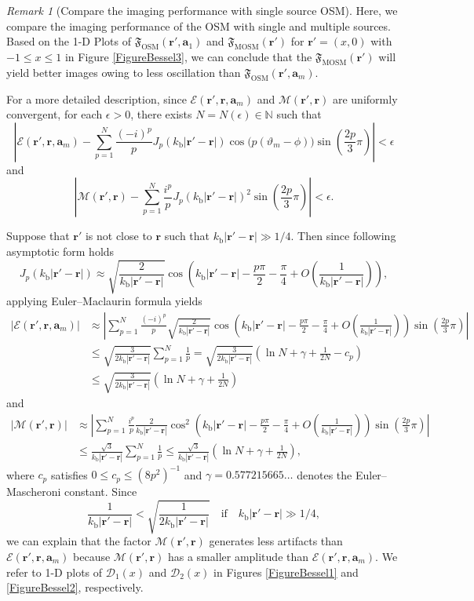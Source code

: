 \documentclass[3p,10pt]{elsarticle}
\newcommand{\kb}{k_{\mathrm{b}}}
\newcommand{\ma}{\mathbf{a}}
\newcommand{\mr}{\mathbf{r}}
\DeclareMathOperator*{\osm}{OSM}
\DeclareMathOperator*{\mosm}{MOSM}
\theoremstyle{plain}
\theoremstyle{remark}
\newtheorem{remark}{Remark}[section]
\begin{document}
\begin{remark}[Compare the imaging performance with single source OSM]\label{RemarkM3}
Here, we compare the imaging performance of the OSM with single and multiple sources. Based on the 1-D Plots of $\mathfrak{F}_{\osm}(\mr',\ma_1)$ and $\mathfrak{F}_{\mosm}(\mr')$ for $\mr'=(x,0)$ with $-1\leq x\leq 1$ in Figure \ref{FigureBessel3}, we can conclude that the $\mathfrak{F}_{\mosm}(\mr')$ will yield better images owing to less oscillation than $\mathfrak{F}_{\osm}(\mr',\ma_m)$.

For a more detailed description, since $\mathcal{E}(\mr',\mr,\ma_m)$ and $\mathcal{M}(\mr',\mr)$ are uniformly convergent, for each $\epsilon>0$, there exists $N=N(\epsilon)\in\mathbb{N}$ such that
\[\left|\mathcal{E}(\mr',\mr,\ma_m)-\sum_{p=1}^{N}\frac{(-i)^p}{p}J_p(\kb|\mr'-\mr|)\cos\big(p(\vartheta_m-\phi)\big)\sin\left(\frac{2p}{3}\pi\right)\right|<\epsilon\]
and
\[\left|\mathcal{M}(\mr',\mr)-\sum_{p=1}^{N}\frac{i^p}{p}J_p(\kb|\mr'-\mr|)^2\sin\left(\frac{2p}{3}\pi\right)\right|<\epsilon.\]

Suppose that $\mr'$ is not close to $\mr$ such that $\kb|\mr'-\mr|\gg1/4$. Then since following asymptotic form holds 
\[J_p(\kb|\mr'-\mr|)\approx\sqrt{\frac{2}{\kb|\mr'-\mr|}}\cos\left(\kb|\mr'-\mr|-\frac{p\pi}{2}-\frac{\pi}{4}+O\left(\frac{1}{\kb|\mr'-\mr|}\right)\right),\]
applying Euler–Maclaurin formula yields
\begin{align*}
|\mathcal{E}(\mr',\mr,\ma_m)|&\approx\left|\sum_{p=1}^{N}\frac{(-i)^p}{p}\sqrt{\frac{2}{\kb|\mr'-\mr|}}\cos\left(\kb|\mr'-\mr|-\frac{p\pi}{2}-\frac{\pi}{4}+O\left(\frac{1}{\kb|\mr'-\mr|}\right)\right)\sin\left(\frac{2p}{3}\pi\right)\right|\\
&\leq\sqrt{\frac{3}{2\kb|\mr'-\mr|}}\sum_{p=1}^{N}\frac{1}{p}=\sqrt{\frac{3}{2\kb|\mr'-\mr|}}\left(\ln N+\gamma+\frac{1}{2N}-c_p\right)\\
&\leq\sqrt{\frac{3}{2\kb|\mr'-\mr|}}\left(\ln N+\gamma+\frac{1}{2N}\right)
\end{align*}
and
\begin{align*}
|\mathcal{M}(\mr',\mr)|&\approx\left|\sum_{p=1}^{N}\frac{i^p}{p}\frac{2}{\kb|\mr'-\mr|}\cos^2\left(\kb|\mr'-\mr|-\frac{p\pi}{2}-\frac{\pi}{4}+O\left(\frac{1}{\kb|\mr'-\mr|}\right)\right)\sin\left(\frac{2p}{3}\pi\right)\right|\\
&\leq\frac{\sqrt{3}}{\kb|\mr'-\mr|}\sum_{p=1}^{N}\frac{1}{p}\leq\frac{\sqrt{3}}{\kb|\mr'-\mr|}\left(\ln N+\gamma+\frac{1}{2N}\right),
\end{align*}
where $c_p$ satisfies $0\leq c_p \leq(8p^2)^{-1}$ and $\gamma=0.577215665\ldots$ denotes the Euler–Mascheroni constant. Since
\[\frac{1}{\kb|\mr'-\mr|}<\sqrt{\frac{1}{2\kb|\mr'-\mr|}}\quad\text{if}\quad\kb|\mr'-\mr|\gg1/4,\]
we can explain that the factor $\mathcal{M}(\mr',\mr)$ generates less artifacts than $\mathcal{E}(\mr',\mr,\ma_m)$ because $\mathcal{M}(\mr',\mr)$ has a smaller amplitude than $\mathcal{E}(\mr',\mr,\ma_m)$. We refer to 1-D plots of $\mathcal{D}_1(x)$ and $\mathcal{D}_2(x)$ in Figures \ref{FigureBessel1} and \ref{FigureBessel2}, respectively.
\end{remark}
\end{document}
